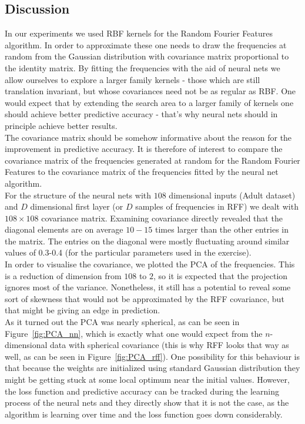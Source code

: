 \documentclass{article} %
\begin{document}
\subsection{Discussion}
In our experiments we used RBF kernels for the Random Fourier Features algorithm. In order to approximate these one needs to draw the frequencies at random from the Gaussian distribution with covariance matrix proportional to the identity matrix. By fitting the frequencies with the aid of neural nets we allow ourselves to explore a larger family kernels - those which are still translation invariant, but whose covariances need not be as regular as RBF. One would expect that by extending the search area to a larger family of kernels one should achieve better predictive accuracy - that's why neural nets should in principle achieve better results.\\

The covariance matrix should be somehow informative about the reason for the improvement in predictive accuracy. It is therefore of interest to compare the covariance matrix of the frequencies generated at random for the Random Fourier Features to the covariance matrix of the frequencies fitted by the neural net algorithm.\\

For the structure of the neural nets with $108$ dimensional inputs (Adult dataset) and $D$ dimensional first layer (or $D$ samples of frequencies in RFF) we dealt with $108\times 108$ covariance matrix. Examining covariance directly revealed that the diagonal elements are on average $10-15$ times larger than the other entries in the matrix. The entries on the diagonal were mostly fluctuating around similar values of 0.3-0.4 (for the particular parameters used in the exercise).\\

In order to visualise the covariance, we plotted the PCA of the frequencies. This is a reduction of dimension from $108$ to $2$, so it is expected that the projection ignores most of the variance. Nonetheless, it still has a potential to reveal some sort of skewness that would not be approximated by the RFF covariance, but that might be giving an edge in prediction.\\

As it turned out the PCA was nearly spherical, as can be seen in Figure~\ref{fig:PCA_nn}, which is exactly what one would expect from the $n$-dimensional data with spherical covariance (this is why RFF looks that way as well, as can be seen in Figure~\ref{fig:PCA_rff}). One possibility for this behaviour is that because the weights are initialized using standard Gaussian distribution they might be getting stuck at some local optimum near the initial values. However, the loss function and predictive accuracy can be tracked during the learning process of the neural nets and they directly show that it is not the case, as the algorithm is learning over time and the loss function goes down considerably.\\
\end{document}
